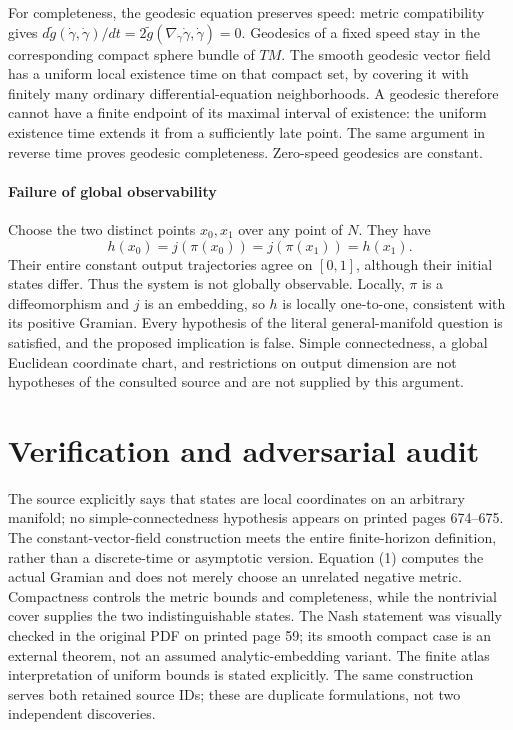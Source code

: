 \documentclass[11pt]{article}
\begin{document}
For completeness, the geodesic equation preserves speed: metric compatibility gives $d\widetilde g(\dot\gamma,\dot\gamma)/dt=2\widetilde g(\nabla_{\dot\gamma}\dot\gamma,\dot\gamma)=0$. Geodesics of a fixed speed stay in the corresponding compact sphere bundle of $TM$. The smooth geodesic vector field has a uniform local existence time on that compact set, by covering it with finitely many ordinary differential-equation neighborhoods. A geodesic therefore cannot have a finite endpoint of its maximal interval of existence: the uniform existence time extends it from a sufficiently late point. The same argument in reverse time proves geodesic completeness. Zero-speed geodesics are constant.

\paragraph{Failure of global observability}
Choose the two distinct points $x_0,x_1$ over any point of $N$. They have
\[
 h(x_0)=j(\pi(x_0))=j(\pi(x_1))=h(x_1).
\]
Their entire constant output trajectories agree on $[0,1]$, although their initial states differ. Thus the system is not globally observable. Locally, $\pi$ is a diffeomorphism and $j$ is an embedding, so $h$ is locally one-to-one, consistent with its positive Gramian. Every hypothesis of the literal general-manifold question is satisfied, and the proposed implication is false. Simple connectedness, a global Euclidean coordinate chart, and restrictions on output dimension are not hypotheses of the consulted source and are not supplied by this argument.

\section{Verification and adversarial audit}
The source explicitly says that states are local coordinates on an arbitrary manifold; no simple-connectedness hypothesis appears on printed pages 674--675. The constant-vector-field construction meets the entire finite-horizon definition, rather than a discrete-time or asymptotic version. Equation (1) computes the actual Gramian and does not merely choose an unrelated negative metric. Compactness controls the metric bounds and completeness, while the nontrivial cover supplies the two indistinguishable states. The Nash statement was visually checked in the original PDF on printed page 59; its smooth compact case is an external theorem, not an assumed analytic-embedding variant. The finite atlas interpretation of uniform bounds is stated explicitly. The same construction serves both retained source IDs; these are duplicate formulations, not two independent discoveries.
\end{document}
